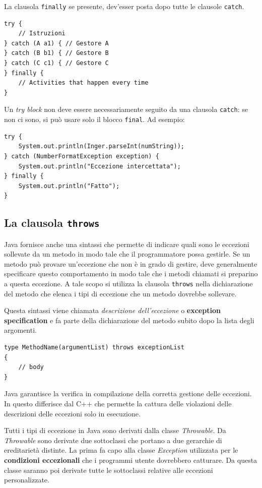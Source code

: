 \documentclass[12pt]{report}
\begin{document}
La clausola \texttt{finally} se presente, dev'esser posta dopo tutte le clausole \texttt{catch}.
\begin{lstlisting}[style=javastyle]
try {
	// Istruzioni
} catch (A a1) { // Gestore A
} catch (B b1) { // Gestore B
} catch (C c1) { // Gestore C
} finally {
	// Activities that happen every time
}
\end{lstlisting}
Un \textit{try block} non deve essere necessariamente seguito da una clausola \texttt{catch}: se non ci sono, si può usare solo il blocco \texttt{final}. Ad esempio:
\begin{lstlisting}[style=javastyle]
try {
	System.out.println(Inger.parseInt(numString));
} catch (NumberFormatException exception) {
	System.out.println("Eccezione intercettata");
} finally {
	System.out.println("Fatto");
}
\end{lstlisting}
\subsection{La clausola \texttt{throws}} Java fornisce anche una sintassi che permette di indicare quali sono le eccezioni sollevate da un metodo in modo tale che il programmatore possa gestirle. Se un metodo può provare un'eccezione che non è in grado di gestire, deve generalmente specificare questo comportamento in modo tale che i metodi chiamati si preparino a questa eccezione. A tale scopo si utilizza la clausola \texttt{throws} nella dichiarazione del metodo che elenca i tipi di eccezione che un metodo dovrebbe sollevare.

Questa sintassi viene chiamata \textit{descrizione dell'eccezione} o \textbf{exception specification} e fa parte della dichiarazione del metodo subito dopo la lista degli argomenti.
\begin{lstlisting}[style=javastyle]
type MethodName(argumentList) throws exceptionList
{
	// body
}
\end{lstlisting}
Java garantisce la verifica in compilazione della corretta gestione delle eccezioni. In questo differisce dal C++ che permette la cattura delle violazioni delle descrizioni delle eccezioni solo in esecuzione.

Tutti i tipi di eccezione in Java sono derivati dalla classe \textit{Throwable}. Da \textit{Throwable} sono derivate due sottoclassi che portano a due gerarchie di ereditarietà distinte. La prima fa capo alla classe \textit{Exception} utilizzata per le \textbf{condizioni eccezionali} che i programmi utente dovrebbero catturare. Da questa classe saranno poi derivate tutte le sottoclassi relative alle eccezioni personalizzate.
\end{document}
